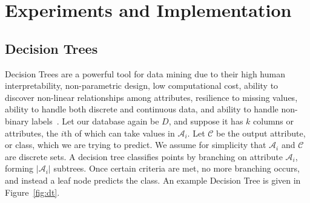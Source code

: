 \documentclass[11pt]{report}
\begin{document}
\chapter{Experiments and Implementation}
\section{Decision Trees}

Decision Trees are a powerful tool for data mining due to their high human interpretability, non-parametric design, low computational cost, ability to discover non-linear relationships among attributes, resilience to missing values, ability to handle both discrete and continuous data, and ability to handle non-binary labels~\cite{Fletcher:2016}. Let our database again be $D$, and suppose it has $k$ columns or attributes, the $i$th of which can take values in $\mathcal{A}_i$. Let $\mathcal{C}$ be the output attribute, or class, which we are trying to predict. We assume for simplicity that $\mathcal{A}_i$ and $\mathcal{C}$ are discrete sets. A decision tree classifies points by branching on attribute $\mathcal{A}_i$, forming $|\mathcal{A}_i|$ subtrees. Once certain criteria are met, no more branching occurs, and instead a leaf node predicts the class. An example Decision Tree is given in Figure~\ref{fig:dt}.
\end{document}
